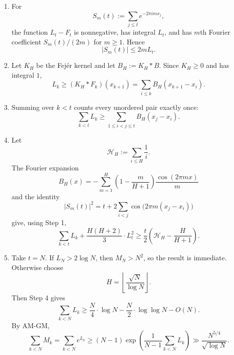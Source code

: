 \documentclass[11pt]{article}
\begin{document}
\vspace{8pt}
\begingroup
\setlength{\parskip}{0pt}
\begin{enumerate}
\item For
  \[
    S_m(t) := \sum_{j\leq t} e^{-2\pi i m x_j},
  \]
  the function $L_t-F_t$ is nonnegative, has integral $L_t$, and has
  $m$th Fourier coefficient $S_m(t)/(2m)$ for $m\geq 1$. Hence
  \[
    |S_m(t)|\leq 2mL_t.
  \]

\item Let $K_H$ be the Fej\'er kernel and let $B_H:=K_H*B$. Since
  $K_H\geq 0$ and has integral $1$,
  \[
    L_k\geq (K_H*F_k)(x_{k+1})
    =\sum_{i\leq k} B_H(x_{k+1}-x_i).
  \]

\item Summing over $k<t$ counts every unordered pair exactly once:
  \[
    \sum_{k<t} L_k
    \geq
    \sum_{1\leq i<j\leq t} B_H(x_j-x_i).
  \]

\item Let
  \[
    \mathcal{H}_H := \sum_{i\leq H}\frac{1}{i}.
  \]
  The Fourier expansion
  \[
    B_H(x)
    =
    -\sum_{m=1}^H
    \left(1-\frac{m}{H+1}\right)
    \frac{\cos(2\pi m x)}{m}
  \]
  and the identity
  \[
    |S_m(t)|^2
    =
    t+2\sum_{i<j}\cos\bigl(2\pi m(x_j-x_i)\bigr)
  \]
  give, using Step 1,
  \[
    \sum_{k<t}L_k
    +\frac{H(H+2)}{3}\cdot L_t^2
    \geq
    \frac{t}{2}
    \left(\mathcal{H}_H-\frac{H}{H+1}\right).
  \]

\item Take $t=N$. If $L_N>2\log N$, then $M_N>N^2$, so the result is
  immediate. Otherwise choose
  \[
    H=\left\lfloor\frac{\sqrt{N}}{\log N}\right\rfloor.
  \]
  Then Step 4 gives
  \[
    \sum_{k<N}L_k
    \geq
    \frac{N}{4}\cdot\log N
    -\frac{N}{2}\cdot\log\log N
    -O(N).
  \]
  By AM-GM,
  \[
    \sum_{k<N}M_k
    =
    \sum_{k<N}e^{L_k}
    \geq
    (N-1)\exp\left(
      \frac{1}{N-1}\sum_{k<N}L_k
    \right)
    \gg
    \frac{N^{5/4}}{\sqrt{\log N}}.
  \]
\end{enumerate}
\endgroup
\end{document}

